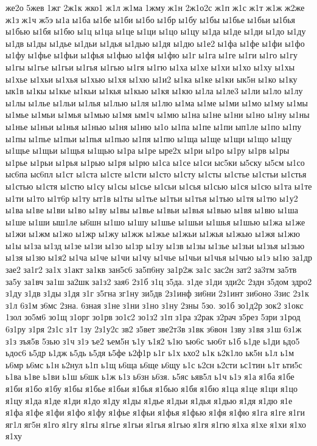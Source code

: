 {же2о
5жев
1жг
2ж1к
жко1
ж1л
ж1ма
1жму
ж1н
2ж1о2с
ж1п
ж1с
ж1т
ж1ж
ж2же
ж1з
ж1ч
ж5э
ы1а
ы1ба
ы1бе
ы1би
ы1бо
ы1бр
ы1бу
ы1бы
ы1бье
ы1бьи
ы1бья
ы1бью
ы1бя
ы1бю
ы1ц
ы1ца
ы1це
ы1ци
ы1цо
ы1цу
ы1да
ы1де
ы1ди
ы1до
ы1ду
ы1дв
ы1ды
ы1дье
ы1дьи
ы1дья
ы1дью
ы1дя
ы1дю
ы1е2
ы1фа
ы1фе
ы1фи
ы1фо
ы1фу
ы1фье
ы1фьи
ы1фья
ы1фью
ы1фя
ы1фю
ы1г
ы1га
ы1ге
ы1ги
ы1го
ы1гу
ы1гы
ы1гье
ы1гьи
ы1гья
ы1гью
ы1гя
ы1гю
ы1ха
ы1хе
ы1хи
ы1хо
ы1ху
ы1хы
ы1хье
ы1хьи
ы1хья
ы1хью
ы1хя
ы1хю
ы1и2
ы1ка
ы1ке
ы1ки
ык5н
ы1ко
ы1ку
ык1в
ы1кы
ы1кье
ы1кьи
ы1кья
ы1кью
ы1кя
ы1кю
ы1ла
ы1ле3
ы1ли
ы1ло
ы1лу
ы1лы
ы1лье
ы1льи
ы1лья
ы1лью
ы1ля
ы1лю
ы1ма
ы1ме
ы1ми
ы1мо
ы1му
ы1мы
ы1мье
ы1мьи
ы1мья
ы1мью
ы1мя
ым1ч
ы1мю
ы1на
ы1не
ы1ни
ы1но
ы1ну
ы1ны
ы1нье
ы1ньи
ы1нья
ы1нью
ы1ня
ы1ню
ы1о
ы1па
ы1пе
ы1пи
ып1ле
ы1по
ы1пу
ы1пы
ы1пье
ы1пьи
ы1пья
ы1пью
ы1пя
ы1пю
ы1ща
ы1ще
ы1щи
ы1що
ы1щу
ы1щье
ы1щьи
ы1щья
ы1щью
ы1ра
ы1ре
ыре2х
ы1ри
ы1ро
ы1ру
ы1рв
ы1ры
ы1рье
ы1рьи
ы1рья
ы1рью
ы1ря
ы1рю
ы1са
ы1се
ы1си
ыс5ки
ы5ску
ы5см
ы1со
ыс6па
ыс6пл
ы1ст
ы1ста
ы1сте
ы1сти
ы1сто
ы1сту
ы1сты
ы1стье
ы1стьи
ы1стья
ы1стью
ы1стя
ы1стю
ы1су
ы1сы
ы1сье
ы1сьи
ы1сья
ы1сью
ы1ся
ы1сю
ы1та
ы1те
ы1ти
ы1то
ы1т6р
ы1ту
ыт1в
ы1ты
ы1тье
ы1тьи
ы1тья
ы1тью
ы1тя
ы1тю
ы1у2
ы1ва
ы1ве
ы1ви
ы1во
ы1ву
ы1вы
ы1вье
ы1вьи
ы1вья
ы1вью
ы1вя
ы1вю
ы1ша
ы1ше
ы1ши
ыш1ле
ы6шн
ы1шо
ы1шу
ы1шье
ы1шьи
ы1шья
ы1шью
ы1жа
ы1же
ы1жи
ы1жм
ы1жо
ы1жр
ы1жу
ы1жж
ы1жье
ы1жьи
ы1жья
ы1жью
ы1жя
ы1жю
ы1ы
ы1за
ы1зд
ы1зе
ы1зи
ы1зо
ы1зр
ы1зу
ы1зв
ы1зы
ы1зье
ы1зьи
ы1зья
ы1зью
ы1зя
ы1зю
ы1я2
ы1ча
ы1че
ы1чи
ы1чу
ы1чье
ы1чьи
ы1чья
ы1чью
ы1э
ы1ю
за1др
зае2
за1г2
за1х
з1акт
за1кв
зан5с6
за5п6ну
за1р2ж
за1с
зас2н
зат2
за3тм
за5тв
за5у
за1вч
за1ш
за2шк
за1з2
зая6
2з1б
з1ц
з5да.
з1де
з1ди
зди2с
2здн
з5дом
здро2
з1ду
з1дв
з1ды
з1дя
з1г
з5гна
зг1ну
зи5дв
2з1инф
зи6ни
2з1инт
зи6оно
3зис
2з1к
з1л
6з1м
з6мс
2зна.
6зная
з1не
з1ни
з1но
з1ну
2зны
5зо.
зо1б
зо1д2р
зок2
з1окс
1зол
зо5м6
зо1щ
з1орг
зо1рв
зо1с2
зо1з2
з1п
з1ра
з2рак
з2рач
з5рез
5зри
з1род
6з1ру
з1ря
2з1с
з1т
1зу
2з1у2с
зв2
з5вет
зве2т3в
з1вк
з6вон
1зву
з1вя
з1ш
6з1ж
з1з
зъя5в
5зью
з1ч
з1э
ъе2
ъем5н
ъ1у
ъ1я2
ъ1ю
ъю6с
ъю6т
ь1б
ь1де
ь1ди
ьдо5
ьдос6
ь5др
ь1дж
ь5дь
ь5дя
ь5фе
ь2ф1р
ь1г
ь1х
ьхо2
ь1к
ь2к1ло
ьк5н
ь1л
ь1м
ь6мр
ь6мс
ь1н
ь2нул
ь1п
ь1щ
ь6ща
ь6ще
ь6щу
ь1с
ь2сн
ь2сти
ьс1тин
ь1т
ьти5с
ь1ва
ь1ве
ь1ви
ь1ш
ь6шк
ь1ж
ь1з
ь6зн
ь6зя.
ь5яс
ьяв5л
ь1ч
ь1э
я1а
я1ба
я1бе
я1би
я1бо
я1бу
я1бы
я1бье
я1бьи
я1бья
я1бью
я1бя
я1бю
я1ца
я1це
я1ци
я1цо
я1цу
я1да
я1де
я1ди
я1до
я1ду
я1ды
я1дье
я1дьи
я1дья
я1дью
я1дя
я1дю
я1е
я1фа
я1фе
я1фи
я1фо
я1фу
я1фье
я1фьи
я1фья
я1фью
я1фя
я1фю
я1га
я1ге
я1ги
яг1л
яг5н
я1го
я1гу
я1гы
я1гье
я1гьи
я1гья
я1гью
я1гя
я1гю
я1ха
я1хе
я1хи
я1хо
я1ху
}
